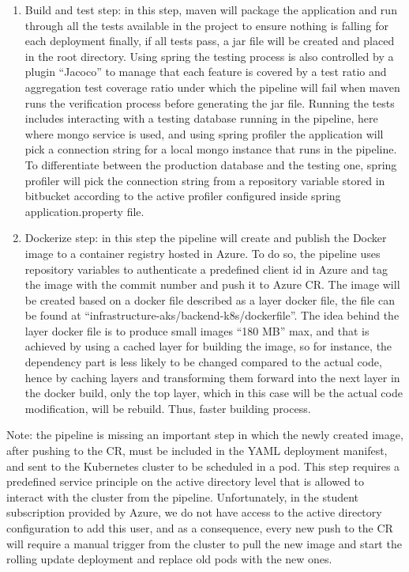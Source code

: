\begin{enumerate}
    \item Build and test step: in this step, maven will package the application and run through all the tests available in the project to ensure nothing is falling for each deployment finally, if all tests pass, a jar file will be created and placed in the root directory. Using spring the testing process is also controlled by a plugin “Jacoco” to manage that each feature is covered by a test ratio and aggregation test coverage ratio under which the pipeline will fail when maven runs the verification process before generating the jar file. Running the tests includes interacting with a testing database running in the pipeline, here where mongo service is used, and using spring profiler the application will pick a connection string for a local mongo instance that runs in the pipeline. To differentiate between the production database and the testing one, spring profiler will pick the connection string from a repository variable stored in bitbucket according to the active profiler configured inside spring application.property file.
    \item Dockerize step: in this step the pipeline will create and publish the Docker image to a container registry hosted in Azure. To do so, the pipeline uses repository variables to authenticate a predefined client id in Azure and tag the image with the commit number and push it to Azure CR. The image will be created based on a docker file described as a layer docker file, the file can be found at “infrastructure-aks/backend-k8s/dockerfile”. The idea behind the layer docker file is to produce small images “180 MB” max, and that is achieved by using a cached layer for building the image, so for instance, the dependency part is less likely to be changed compared to the actual code, hence by caching layers and transforming them forward into the next layer in the docker build, only the top layer, which in this case will be the actual code modification, will be rebuild. Thus, faster building process. 
\end{enumerate}

Note: the pipeline is missing an important step in which the newly created image, after pushing to the CR, must be included in the YAML deployment manifest, and sent to the Kubernetes cluster to be scheduled in a pod. This step requires a predefined service principle on the active directory level that is allowed to interact with the cluster from the pipeline. Unfortunately, in the student subscription provided by Azure, we do not have access to the active directory configuration to add this user, and as a consequence, every new push to the CR will require a manual trigger from the cluster to pull the new image and start the rolling update deployment and replace old pods with the new ones.

